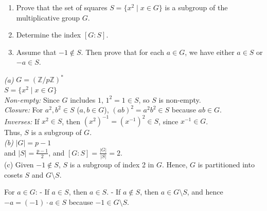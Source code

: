 \begin{enumerate}
    \item[(a)] Prove that the set of squares \( S = \{ x^2 \mid x \in G \} \) is a subgroup of the multiplicative group \( G \).
    
    \item[(b)] Determine the index \( [G : S] \).
    
    \item[(c)] Assume that \( -1 \notin S \). Then prove that for each \( a \in G \), we have either \( a \in S \) or \( -a \in S \).
\end{enumerate}
\textit{(a)} \( G = (\mathbb{Z}/p\mathbb{Z})^* \)\\
\( S = \{ x^2 \mid x \in G \} \)
\\
\textit{Non-empty:} Since \( G \) includes \( 1 \), \( 1^2 = 1 \in S \), so \( S \) is non-empty.
\\
\textit{Closure:} For \( a^2, b^2 \in S \) (\( a, b \in G \)), \( (ab)^2 = a^2 b^2 \in S \) because \( ab \in G \).
\\
\textit{Inverses:} If \( x^2 \in S \), then \( (x^2)^{-1} = (x^{-1})^2 \in S \), since \( x^{-1} \in G \).
\\
Thus, \( S \) is a subgroup of \( G \).
\\
\textit{(b)} \( |G| = p - 1 \) \\
and \( |S| = \frac{p - 1}{2} \), and \( [G : S] = \frac{|G|}{|S|} = 2 \).
\\
(c) Given \( -1 \notin S \), \( S \) is a subgroup of index 2 in \( G \). Hence, \( G \) is partitioned into cosets \( S \) and \( G \setminus S \).

For \( a \in G \):
- If \( a \in S \), then \( a \in S \).
- If \( a \notin S \), then \( a \in G \setminus S \), and hence \( -a = (-1) \cdot a \in S \) because \( -1 \in G \setminus S \).

